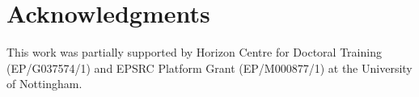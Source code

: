 \documentclass[../main/Feedback.tex]{subfiles}
\begin{document}
\section{Acknowledgments}
This work was partially supported by Horizon Centre for Doctoral Training (EP/G037574/1) and EPSRC Platform Grant (EP/M000877/1) at the University of Nottingham.
\end{document}
